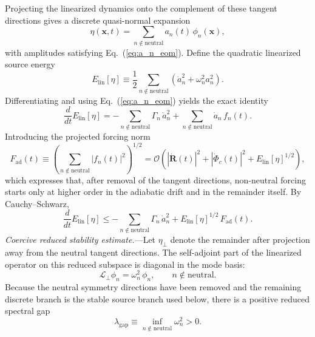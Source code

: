 \documentclass[aps,prd,onecolumn,superscriptaddress,nofootinbib,showpacs,12pt,notitlepage]{revtex4-2}
\renewcommand{\order}[1]{\mathcal{O}\!\left(#1\right)}
\begin{document}
Projecting the linearized dynamics onto the complement of these
tangent directions gives a discrete quasi-normal expansion
\begin{equation}\label{eq:eta_mode_expansion}
  \eta(\mathbf{x},t)
  = \sum_{n\notin \mathrm{neutral}} a_n(t)\,\phi_n(\mathbf{x}),
\end{equation}
with amplitudes satisfying Eq.~(\ref{eq:a_n_eom}).  Define the
quadratic linearized source energy
\begin{equation}\label{eq:eta_linear_energy}
  E_{\mathrm{lin}}[\eta]
  \equiv \frac{1}{2}\sum_{n\notin \mathrm{neutral}}
  \left(\dot a_n^2 + \omega_n^2 a_n^2\right).
\end{equation}
Differentiating and using Eq.~(\ref{eq:a_n_eom}) yields the exact
identity
\begin{equation}\label{eq:eta_energy_identity}
  \frac{d}{dt}E_{\mathrm{lin}}[\eta]
  = -\sum_{n\notin \mathrm{neutral}}\Gamma_n\,\dot a_n^2
    + \sum_{n\notin \mathrm{neutral}}\dot a_n\,f_n(t).
\end{equation}
Introducing the projected forcing norm
\begin{equation}\label{eq:source_forcing_norm}
  F_{\mathrm{ad}}(t)
  \equiv \left(
    \sum_{n\notin \mathrm{neutral}} |f_n(t)|^2
  \right)^{1/2}
  = \order{
    |\dot{\mathbf{R}}(t)|^2
    + |\dot{\Phi}_c(t)|^2
    + E_{\mathrm{lin}}[\eta]^{1/2}
  },
\end{equation}
which expresses that, after removal of the tangent directions,
non-neutral forcing starts only at higher order in the adiabatic
drift and in the remainder itself.  By Cauchy--Schwarz,
\begin{equation}\label{eq:eta_energy_bound}
  \frac{d}{dt}E_{\mathrm{lin}}[\eta]
  \le -\sum_{n\notin \mathrm{neutral}}\Gamma_n\,\dot a_n^2
    + E_{\mathrm{lin}}[\eta]^{1/2}\,F_{\mathrm{ad}}(t).
\end{equation}
\textit{Coercive reduced stability estimate.}---Let
$\eta_\perp$ denote the remainder after projection away from the
neutral tangent directions.  The self-adjoint part of the linearized
operator on this reduced subspace is diagonal in the mode basis:
\begin{equation}\label{eq:reduced_linear_operator}
  \mathcal{L}_{\perp}\phi_n = \omega_n^2\,\phi_n,
  \qquad n\notin \mathrm{neutral}.
\end{equation}
Because the neutral symmetry directions have been removed and the
remaining discrete branch is the stable source branch used below,
there is a positive reduced spectral gap
\begin{equation}\label{eq:reduced_gap_def}
  \lambda_{\mathrm{gap}}
  \equiv \inf_{n\notin \mathrm{neutral}}\omega_n^2 > 0.
\end{equation}
\end{document}
